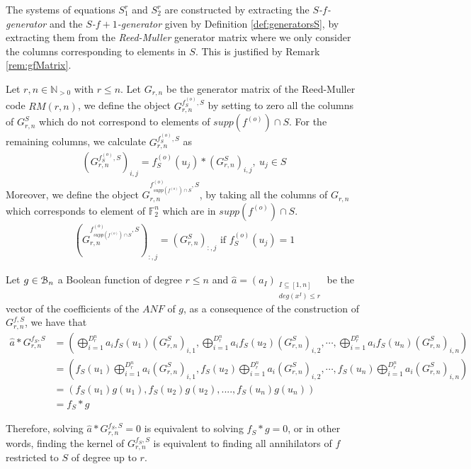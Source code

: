 \documentclass[11pt]{llncs}
\begin{document}
The systems of equations $S_1^r$ and $S_2^r$ are constructed by extracting the \textit{$S$-$f$-generator} and the \textit{$S$-$f+1$-generator} given by Definition \ref{def:generatorsS}, by extracting them from the \textit{Reed-Muller} generator matrix where we only consider the columns corresponding to elements in $S$. This is justified by Remark \ref{rem:gfMatrix}.



\begin{definition}\label{def:generatorsS}
Let $r,n\in\mathbb{N}_{>0}$ with $r\leq n$. Let $G_{r,n}$ be the generator matrix of the Reed-Muller code $RM(r,n)$, we define the object $G_{r,n}^{f^{(o)}_S,S}$ by setting to zero all the columns of $G_{r,n}^S$ which do not correspond to elements of $supp(f^{(o)} )\cap S$. For the remaining columns, we calculate $G_{r,n}^{f_S^{(o)},S}$ as
	\begin{align*}
	\left(G_{r,n}^{f^{(o)}_S,S}\right)_{i,j} = f_S^{(o)}(u_j)*\left(G_{r,n}^S\right)_{i,j}, \ u_j \in S
	\end{align*}
	Moreover, we define the object $G_{r,n}^{f^{(o)}_{supp\left(f^{(o)}\right) \cap S},S}$, by taking all the columns of $G_{r,n}$ which corresponds to element of $\mathbb{F}_2^n$ which are in $supp\left(f^{(o)}\right) \cap S$.
	\begin{align}
	\left(G_{r,n}^{f_{supp\left(f^{(o)}\right) \cap S}^{(o)},S}\right)_{:,j} = (G_{r,n}^S)_{:,j} \mbox{ if } f_S^{(o)}(u_j) = 1 \label{eq:f-generatorRestrictedSet}
	\end{align}
\end{definition}

\begin{remark}\label{rem:gfMatrix}
	Let $g \in \mathcal{B}_{n}$ a Boolean function of degree $r\leq n$ and $\hat{a} = \left(a_I\right)_{\substack{I \subseteq [1,n] \\ deg\left(x^I\right) \leq r}}$ be the vector of the coefficients of the $ANF$ of $g$, as a consequence of the construction of $G_{r,n}^{f,S}$, we have that
	\begin{equation}
	\begin{aligned}
	\hat{a} * G_{r,n}^{f_S,S} & = \left(\bigoplus_{i=1}^{D_r^n}a_i f_S(u_1)(G_{r,n}^S)_{i,1}, \bigoplus_{i=1}^{D_r^n}a_i f_S(u_2)(G_{r,n}^S)_{i,2}, \cdots, \bigoplus_{i=1}^{D_r^n}a_i f_S(u_n)(G_{r,n}^S)_{i,n}\right)     \\
	& =  \left(f_S(u_1) \bigoplus_{i=1}^{D_r^n}a_i (G_{r,n}^S)_{i,1}, f_S(u_2) \bigoplus_{i=1}^{D_r^n}a_i (G_{r,n}^S)_{i,2}, \cdots, f_S(u_n) \bigoplus_{i=1}^{D_r^n}a_i (G_{r,n}^S)_{i,n}\right) \\
	& = \left(f_S(u_1) g(u_1), f_S(u_2) g(u_2), ...., f_S(u_n) g(u_n)\right)                                                                                      \\
	& = f_S*g
	\end{aligned}
	\end{equation}
	
	Therefore, solving $ \hat{a} * G_{r,n}^{f_S,S} = 0$ is equivalent to solving $f_S*g = 0$, or in other words, finding the kernel of $G_{r,n}^{f_S,S}$ is equivalent to finding all annihilators of $f$ restricted to $S$ of degree up to $r$.
\end{remark}
\end{document}
